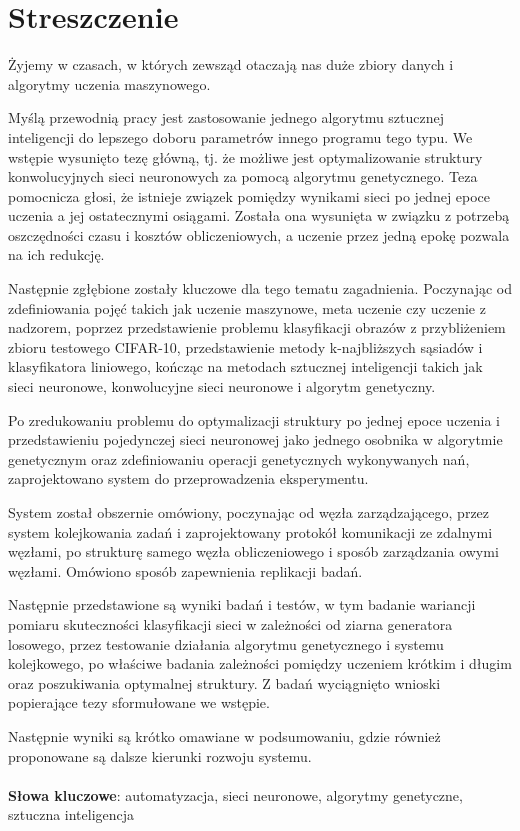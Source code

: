 \chapter*{Streszczenie}

Żyjemy w czasach, w których zewsząd otaczają nas duże zbiory danych i algorytmy uczenia maszynowego.

Myślą przewodnią pracy jest zastosowanie jednego algorytmu sztucznej inteligencji do lepszego doboru parametrów innego programu tego typu.
We wstępie wysunięto tezę główną, tj. że możliwe jest optymalizowanie struktury konwolucyjnych sieci neuronowych za pomocą algorytmu genetycznego.
Teza pomocnicza głosi, że istnieje związek pomiędzy wynikami sieci po jednej epoce uczenia a jej ostatecznymi osiągami.
Została ona wysunięta w związku z potrzebą oszczędności czasu i kosztów obliczeniowych, a uczenie przez jedną epokę pozwala na ich redukcję.


Następnie zgłębione zostały kluczowe dla tego tematu zagadnienia. Poczynając od zdefiniowania pojęć takich jak uczenie maszynowe, meta uczenie czy uczenie z nadzorem,
poprzez przedstawienie problemu klasyfikacji obrazów z przybliżeniem zbioru testowego CIFAR-10, przedstawienie metody k-najbliższych sąsiadów i klasyfikatora liniowego, kończąc
na metodach sztucznej inteligencji takich jak sieci neuronowe, konwolucyjne sieci neuronowe i algorytm genetyczny.

Po zredukowaniu problemu do optymalizacji struktury po jednej epoce uczenia i przedstawieniu pojedynczej sieci neuronowej jako jednego osobnika w algorytmie genetycznym oraz zdefiniowaniu operacji genetycznych
wykonywanych nań, zaprojektowano system do przeprowadzenia eksperymentu.

System został obszernie omówiony, poczynając od węzła zarządzającego, przez system kolejkowania zadań i zaprojektowany protokół komunikacji ze zdalnymi węzłami, po strukturę samego węzła obliczeniowego
i sposób zarządzania owymi węzłami. Omówiono sposób zapewnienia replikacji badań.

Następnie przedstawione są wyniki badań i testów, w tym badanie wariancji pomiaru skuteczności klasyfikacji sieci w zależności od ziarna generatora losowego, przez testowanie działania algorytmu genetycznego i systemu kolejkowego,
po właściwe badania zależności pomiędzy uczeniem krótkim i długim oraz poszukiwania optymalnej struktury. Z badań wyciągnięto wnioski popierające tezy sformułowane we wstępie.

Następnie wyniki są krótko omawiane w podsumowaniu, gdzie również proponowane są dalsze kierunki rozwoju systemu.
\\\\
\noindent
\textbf{Słowa kluczowe}: automatyzacja, sieci neuronowe, algorytmy genetyczne, sztuczna inteligencja
\\

